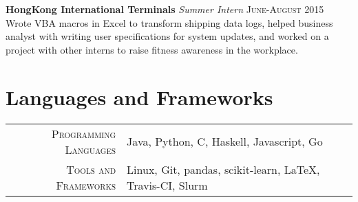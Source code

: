 \documentclass{article}
\newcommand{\n}[0]{\\[\baselineskip]}
\begin{document}
\textbf{HongKong International Terminals} \textit{Summer Intern}
\hfill
\textsc{June-August 2015} \\
Wrote VBA macros in Excel to transform shipping data logs, helped business analyst
with writing user specifications for system updates, and worked on a project with other
interns to raise fitness awareness in the workplace.


\section*{Languages and Frameworks}
\begin{tabular}{r|p{15cm}}
\textsc{Programming Languages} & Java, Python, C, Haskell, Javascript, Go\\

\textsc{Tools and Frameworks} & Linux, Git, pandas, scikit-learn, \LaTeX, Travis-CI, Slurm %
\end{tabular}




% 
% 
\end{document}
